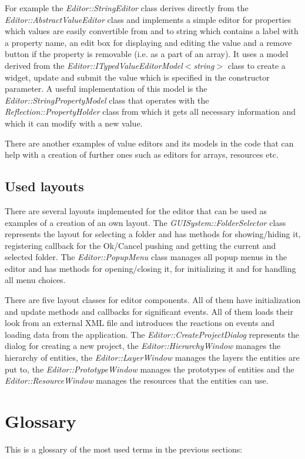 For example the \emph{Editor::StringEditor} class derives directly from the \emph{Editor::AbstractValueEditor} class and implements a simple editor for properties which values are easily convertible from and to string which contains a label with a property name, an edit box for displaying and editing the value and a remove button if the property is removable (i.e. as a part of an array). It uses a model derived from the \emph{Editor::ITypedValueEditorModel$<$string$>$} class to create a widget, update and submit the value which is specified in the constructor parameter. A useful implementation of this model is the \emph{Editor::StringPropertyModel} class that operates with the \emph{Reflection::Property\-Holder} class from which it gets all necessary information and which it can modify with a new value.

There are another examples of value editors and its models in the code that can help with a creation of further ones such as editors for arrays, resources etc.

\subsection{Used layouts}

There are several layouts implemented for the editor that can be used as examples of a creation of an own layout. The \emph{GUISystem::FolderSelector} class represents the layout for selecting a folder and has methods for showing/hiding it, registering callback for the Ok/Cancel pushing and getting the current and selected folder. The \emph{Editor::PopupMenu} class manages all popup menus in the editor and has methods for opening/closing it, for initializing it and for handling all menu choices.

There are five layout classes for editor components. All of them have initialization and update methods and callbacks for significant events. All of them loads their look from an external XML file and introduces the reactions on events and loading data from the application. The \emph{Editor::Create\-Project\-Dialog} represents the dialog for creating a new project, the \emph{Editor\-::\-Hierarchy\-Window} manages the hierarchy of entities, the \emph{Editor\-::\-Layer\-Window} manages the layers the entities are put to, the \emph{Editor\-::\-Prototype\-Window} manages the prototypes of entities and the \emph{Editor\-::\-Resource\-Window} manages the resources that the entities can use.

\section{Glossary}
This is a glossary of the most used terms in the previous sections:


